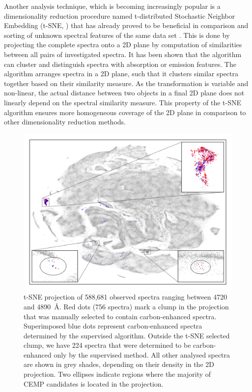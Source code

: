 Another analysis technique, which is becoming increasingly popular is a dimensionality reduction procedure named t-distributed Stochastic Neighbor Embedding (t-SNE, \cite{van2008visualizing}) that has already proved to be beneficial in comparison and sorting of unknown spectral features of the same data set \cite{2017ApJS..228...24T}. This is done by projecting the complete spectra onto a 2D plane by computation of similarities between all pairs of investigated spectra. It has been shown that the algorithm can cluster and distinguish spectra with absorption or emission features. The algorithm arranges spectra in a 2D plane, such that it clusters similar spectra together based on their similarity measure. As the transformation is variable and non-linear, the actual distance between two objects in a final 2D plane does not linearly depend on the spectral similarity measure. This property of the t-SNE algorithm ensures more homogeneous coverage of the 2D plane in comparison to other dimensionality reduction methods.

\begin{figure}
	\centering
	\includegraphics[width=\textwidth]{tsne_circles.png}
	\caption{t-SNE projection of 588,681 observed spectra ranging between 4720 and 4890~\AA. Red dots (756 spectra) mark a clump in the projection that was manually selected to contain carbon-enhanced spectra. Superimposed blue dots represent carbon-enhanced spectra determined by the supervised algorithm. Outside the t-SNE selected clump, we have 224 spectra that were determined to be carbon-enhanced only by the supervised method. All other analysed spectra are shown in grey shades, depending on their density in the 2D projection. Two ellipses indicate regions where the majority of CEMP candidates is located in the projection.}
	\label{fig:tsne_plot}
\end{figure}

